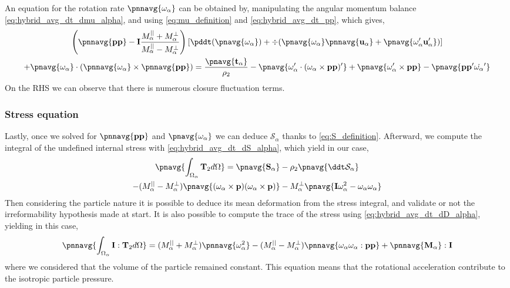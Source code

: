 An equation for the rotation rate $\pnnavg{\omega_\alpha}$ can be obtained by, manipulating the angular momentum balance  \ref{eq:hybrid_avg_dt_dmu_alpha}, and using \ref{eq:mu_definition} and \ref{eq:hybrid_avg_dt_pp}, which gives,
\begin{multline}
    \left(
        \pnnavg{\textbf{pp}} 
        - \textbf{I}\frac{M_\alpha^{||} + M_\alpha^\bot}{M_\alpha^{||} - M_\alpha^\bot}
    \right)\left[
        \pddt (\pnavg{\omega_\alpha})
        + \div (
            \pnavg{\omega_\alpha}\pnnavg{\textbf{u}_\alpha}
            + \pnavg{\omega_\alpha'\textbf{u}_\alpha'})
        \right]\\
    +  \pnavg{\omega_\alpha}
    \cdot(\pnnavg{\omega_\alpha} 
    \times \pnnavg{\textbf{pp}})
    = \frac{\pnavg{\textbf{t}_\alpha}}{\rho_2}
    -\pnavg{\omega_\alpha' \cdot (\omega_\alpha \times \textbf{pp})'}
    +\pnavg{\omega_\alpha' \times \textbf{pp}}
    - \pnavg{\textbf{pp}'\dot{ \omega_\alpha}'}
\end{multline}
On the RHS we can observe that there is numerous closure fluctuation terms.  
\subsubsection*{Stress equation}

Lastly, once we solved for $\pnnavg{\textbf{pp}}$ and $\pnavg{\omega_\alpha}$ we can deduce $\mathcal{S}_\alpha$ thanks to \ref{eq:S_definition}.
Afterward, we compute the integral of the undefined internal stress with \ref{eq:hybrid_avg_dt_dS_alpha}, which yield in our case, 
\begin{multline}
    \pnavg{\int_{\Omega_\alpha} 
        \mathbf{T}_2
    d\Omega}
    =  
      \pnavg{\textbf{S}_\alpha}
    - \rho_2\pnavg{\ddt \mathcal{S}_\alpha}\\
    - (M_\alpha^{||} - M_\alpha^\bot) \pnavg{
        (\omega_\alpha \times \textbf{p}) (\omega_\alpha \times \textbf{p}) } 
    -M_\alpha^\bot \pnavg{\textbf{I} \omega_\alpha^2 -\omega_\alpha\omega_\alpha }
    \label{eq:T2_definition}
\end{multline}
Then considering the particle nature it is possible to deduce its mean deformation from the stress integral, and validate or not the irreformability hypothesis made at start. 
It is also possible to compute the trace of the stress using \ref{eq:hybrid_avg_dt_dD_alpha}, yielding in this case, 
\begin{equation}
    \pnnavg{\int_{\Omega_\alpha} 
        \textbf{I}:\mathbf{T}_2
    d\Omega}
    =  
     (M_\alpha^{||} + M_\alpha^\bot) \pnnavg{
    \omega_\alpha^2} 
    - (M_\alpha^{||} - M_\alpha^\bot) \pnnavg{
    \omega_\alpha\omega_\alpha :  \textbf{pp}}
    + \pnnavg{\textbf{M}_\alpha} : \textbf{I}
\end{equation}
where we considered that the volume of the particle remained constant. 
This equation means that the rotational acceleration contribute to the isotropic particle pressure. 



